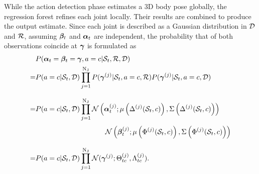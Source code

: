 While the action detection phase estimates a 3D body pose globally, the regression forest refines each joint locally. Their results are combined to produce the output estimate. Since each joint is described as a Gaussian distribution in $\mathcal{D}$ and $\mathcal{R}$, assuming $\boldsymbol{\beta}_{t}$ and $\boldsymbol{\alpha}_{t}$ are independent, the probability that of both observations coincide at $\boldsymbol{\gamma}$ is formulated as
\begin{equation}
	\label{eqn/body/combine}
	\begin{aligned}
		& P( \bodyposead_{\timenow}=\bodyposepr_{\timenow}=\bodyposez, \action=c| \snippetnow, \forestr, \forestd)\\ 
		= & P(\action=c | \snippetnow, \forestd) \prod_{j = 1}^{\njoints} P( \bodyposez^{(j)} | \snippetnow, \action=c, \forestr) P( \bodyposez^{(j)}  | \snippetnow, \action=c, \forestd) \\[3mm]
		= &  P(\action = c | \snippetnow, \forestd) \prod_{j= 1} ^{\njoints}
		\normdist\left(\bodyposead^{(j)}_{\timenow}; \mu\left(\toffsetfunc^{(j)}(\snippetnow,c)\right), \Sigma\left(\toffsetfunc^{(j)}(\snippetnow,c)\right)\right) \\[1mm]
		& \hspace{35mm} \normdist\left(\bodyposepr_{\timenow}^{(j)};\mu\left(\Phi^{(j)}(\snippetnow, c)\right),\Sigma\left(\Phi^{(j)}(\snippetnow,c)\right)\right)\\[3mm]
		= &  P(\action=c | \snippetnow, \forestd) \prod_{j = 1}^{\njoints} \normdist(\bodyposez^{(j)}; \finalbodypose^{(j)}_{\timenow c}, \finalvariance^{(j)}_{\timenow c}).
	\end{aligned}
\end{equation} 
